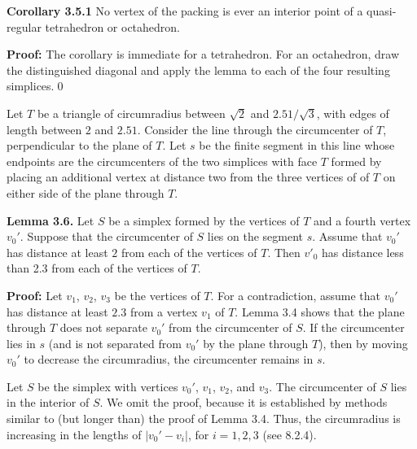 {\bf Corollary 3.5.1}  No vertex of the packing is ever an interior point 
of a quasi-regular tetrahedron or octahedron.

\bigskip
{\bf Proof:}  The corollary is immediate for a tetrahedron.
For an octahedron, draw the distinguished diagonal 
and apply the lemma to
each of the four resulting simplices.\qed
\bigskip


Let $T$ be a triangle of circumradius between
$\sqrt{2}$ and $2.51/\sqrt{3}$,
with edges of length between $2$ and $2.51$.
Consider the line through the circumcenter of $T$, perpendicular
to the plane of $T$.   Let $s$ be the finite segment in this
line whose endpoints are the circumcenters of the two simplices
with face $T$ formed by placing an additional vertex at distance
two from the three vertices of of $T$ on either side
of the plane through $T$.

\bigskip
{\bf Lemma 3.6.} Let $S$ be a simplex formed by the vertices
of $T$ and a fourth vertex $v_0'$.  Suppose that the circumcenter
of $S$ lies on the segment $s$.  Assume that $v_0'$ has distance
at least $2$ from each of 
the vertices of $T$.  Then $v'_0$ has distance
less than 2.3 from each of the vertices of $T$.

{\bf Proof:}  Let $v_1$, $v_2$, $v_3$ be the
vertices of $T$. For a contradiction, assume that 
$v_0'$ has distance at least $2.3$ from a vertex $v_1$ of $T$.
Lemma 3.4 shows that the plane through $T$ does not separate $v_0'$
from the circumcenter of $S$.   If the circumcenter lies in $s$
(and is not separated from $v_0'$
by the plane through $T$), then by moving $v_0'$ to
decrease the circumradius, the circumcenter remains in $s$.

Let $S$ be the simplex with vertices $v_0'$, $v_1$, $v_2$,
and $v_3$.
The circumcenter of $S$ lies in the interior of $S$.  We omit
the proof, because it is established by methods similar to
(but longer than)
the proof of Lemma 3.4.  
Thus,
the circumradius is increasing in the lengths of $|v_0'-v_i|$,
for $i=1,2,3$ (see 8.2.4).  

